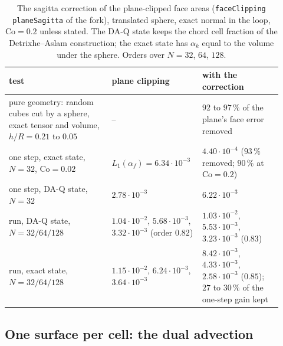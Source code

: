 \begin{table}[htbp]
\centering
\caption{The sagitta correction of the plane-clipped face areas (\texttt{faceClipping planeSagitta} of the fork), translated sphere, exact normal in the loop, $\mathrm{Co} = 0.2$ unless stated. The DA-Q state keeps the chord cell fraction of the Detrixhe--Aslam construction; the exact state has $\alpha_k$ equal to the volume under the sphere. Orders over $N = 32$, $64$, $128$.}
\label{tab:tpf-sagitta}
\footnotesize
\begin{tabular}{p{0.36\linewidth}p{0.28\linewidth}p{0.28\linewidth}}
\toprule
test & plane clipping & with the correction \\
\midrule
pure geometry: random cubes cut by a sphere, exact tensor and volume, $h/R = 0.21$ to $0.05$ & -- & $92$ to $97\,\%$ of the plane's face error removed \\
one step, exact state, $N = 32$, $\mathrm{Co} = 0.02$ & $L_1(\alpha_f) = 6.34\cdot10^{-3}$ & $4.40\cdot10^{-4}$ ($93\,\%$ removed; $90\,\%$ at $\mathrm{Co} = 0.2$) \\
one step, DA-Q state, $N = 32$ & $2.78\cdot10^{-3}$ & $6.22\cdot10^{-3}$ \\
run, DA-Q state, $N = 32/64/128$ & $1.04\cdot10^{-2}$, $5.68\cdot10^{-3}$, $3.32\cdot10^{-3}$ (order $0.82$) & $1.03\cdot10^{-2}$, $5.53\cdot10^{-3}$, $3.23\cdot10^{-3}$ ($0.83$) \\
run, exact state, $N = 32/64/128$ & $1.15\cdot10^{-2}$, $6.24\cdot10^{-3}$, $3.64\cdot10^{-3}$ & $8.42\cdot10^{-3}$, $4.33\cdot10^{-3}$, $2.58\cdot10^{-3}$ ($0.85$); $27$ to $30\,\%$ of the one-step gain kept \\
\bottomrule
\end{tabular}
\end{table}

\subsection{One surface per cell: the dual advection}
\label{sec:tpf-dual}

